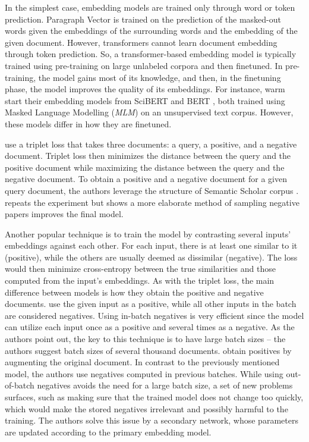 In the simplest case, embedding models are trained only through word or token
prediction. Paragraph Vector \citep{le2014distributed} is trained on the
prediction of the masked-out words given the embeddings of the surrounding
words and the embedding of the given document. However, transformers cannot
learn document embedding through token prediction. So, a transformer-based
embedding model is typically trained using pre-training on large unlabeled
corpora and then finetuned. In pre-training, the model gains most of its
knowledge, and then, in the finetuning phase, the model improves the quality
of its embeddings. For instance, \cite{cohan2020specter,
izacard2021unsupervised} warm start their embedding models from
SciBERT \citep{beltagy2019scibert} and BERT \citep{devlin2019bert}, both
trained using Masked Language Modelling (\emph{MLM}) on an unsupervised text
corpus. However, these models differ in how they are finetuned.

\cite{cohan2020specter} use a triplet loss that takes three documents: a query,
a positive, and a negative document. Triplet loss then minimizes the distance
between the query and the positive document while maximizing the distance
between the query and the negative document. To obtain a positive and a
negative document for a given query document, the authors leverage the
structure of Semantic Scholar corpus \citep{ammar2018construction}.
\cite{ostendorff2022neighborhood} repeats the experiment but shows a more
elaborate method of sampling negative papers improves the final model.

Another popular technique is to train the model by contrasting several inputs'
embeddings against each other. For each input, there is at least one similar to
it (positive), while the others are usually deemed as dissimilar (negative).
The loss would then minimize cross-entropy between the true similarities and
those computed from the input's embeddings. As with the triplet loss, the main
difference between models is how they obtain the positive and negative
documents. \cite{neelakantan2022text} use the given input as a positive, while
all other inputs in the batch are considered negatives. Using in-batch
negatives is very efficient since the model can utilize each input once as a
positive and several times as a negative. As the authors point out, the key to
this technique is to have large batch sizes -- the authors suggest batch sizes
of several thousand documents. \cite{izacard2021unsupervised} obtain positives
by augmenting the original document. In contrast to the previously mentioned
model, the authors use negatives computed in previous batches. While using
out-of-batch negatives avoids the need for a large batch size, a set of new
problems surfaces, such as making sure that the trained model does not change
too quickly, which would make the stored negatives irrelevant and possibly
harmful to the training. The authors solve this issue by a secondary network,
whose parameters are updated according to the primary embedding model.

